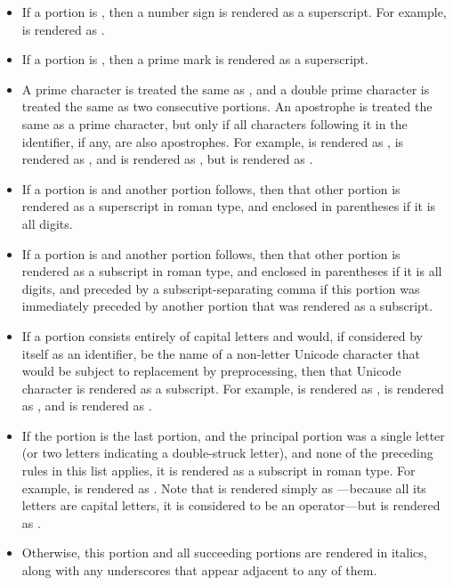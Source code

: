 \begin{itemize}
\item If a portion is , then a number sign  is rendered as a superscript.
For example,  is rendered as .

\item If a portion is , then a prime mark is rendered as a superscript.

\item A prime character is treated the same as , and a double prime character
is treated the same as two consecutive  portions.  An apostrophe is treated
the same as a prime character, but only if all characters following it in the
identifier, if any, are also apostrophes.  For example,
 is rendered as ,
 is rendered as , and
 is rendered as ,
but  is rendered as .

\item If a portion is  and another portion follows, then that other
portion is rendered as a superscript in roman type, and enclosed in parentheses
if it is all digits.

\item If a portion is  and another portion follows, then that other
portion is rendered as a subscript in roman type, and enclosed in parentheses
if it is all digits, and preceded by a subscript-separating comma if this
portion was immediately preceded by another portion that was rendered
as a subscript.

\item If a portion consists entirely of capital letters and would,
if considered by itself as an identifier, be the name of a non-letter Unicode character
that would be subject to replacement by preprocessing, then that Unicode character
is rendered as a subscript.  For example,
 is rendered as ,
 is rendered as , and
 is rendered as .

\item If the portion is the last portion, and the principal
portion was a single letter (or two letters indicating a double-struck letter),
and none of the preceding rules in this list applies,
it is rendered as a subscript in roman type.
For example,
 is rendered as .
Note that  is rendered simply as ---because
all its letters are capital letters, it is considered to be an operator---but
 is rendered as .

\item Otherwise, this portion and all succeeding portions are rendered
in italics, along with any underscores that appear adjacent to any of them.
\end{itemize}


